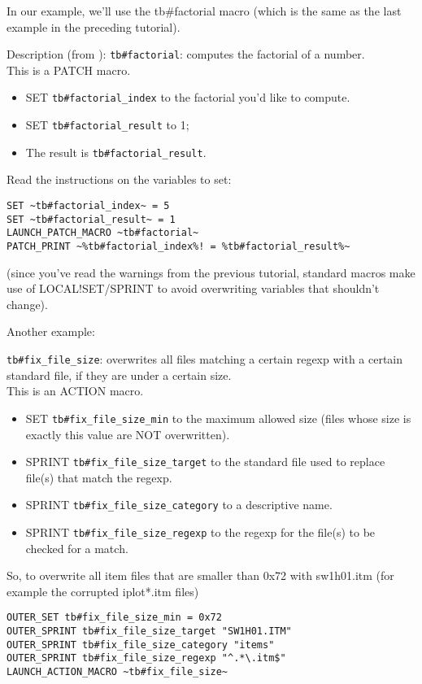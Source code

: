 \documentclass{article}
\def\ttref#1{\ahrefloc{#1}{\tt #1}}
\begin{document}
In our example, we'll use the tb\#factorial macro (which is the same as the
last example in the preceding tutorial).

Description (from \ttref{Macros Listing}):
\verb+tb#factorial+: computes the factorial of a number. \\
This is a PATCH macro.
\begin{itemize}
\item SET \verb+tb#factorial_index+ to the factorial you'd like to compute.
\item SET \verb+tb#factorial_result+ to 1;
\item The result is \verb+tb#factorial_result+.
\end{itemize}

Read the instructions on the variables to set:
\begin{verbatim}
SET ~tb#factorial_index~ = 5
SET ~tb#factorial_result~ = 1
LAUNCH_PATCH_MACRO ~tb#factorial~
PATCH_PRINT ~%tb#factorial_index%! = %tb#factorial_result%~
\end{verbatim}
(since you've read the warnings from the previous tutorial, standard macros
make use of LOCAL!SET/SPRINT to avoid overwriting variables that shouldn't
change).

Another example:

\verb+tb#fix_file_size+: overwrites all files matching a certain regexp with a
certain standard file, if they are under a certain size. \\
This is an ACTION macro.
\begin{itemize}
\item SET \verb+tb#fix_file_size_min+ to the maximum allowed size
(files whose size is exactly this value are NOT overwritten).
\item SPRINT \verb+tb#fix_file_size_target+ to the standard file used to replace file(s) that match the regexp.
\item SPRINT \verb+tb#fix_file_size_category+ to a descriptive name.
\item SPRINT \verb+tb#fix_file_size_regexp+ to the regexp for the file(s) to be checked for a match.
\end{itemize}
So, to overwrite all item files that are smaller than 0x72 with sw1h01.itm
(for example the corrupted iplot*.itm files)
\begin{verbatim}
OUTER_SET tb#fix_file_size_min = 0x72
OUTER_SPRINT tb#fix_file_size_target "SW1H01.ITM"
OUTER_SPRINT tb#fix_file_size_category "items"
OUTER_SPRINT tb#fix_file_size_regexp "^.*\.itm$"
LAUNCH_ACTION_MACRO ~tb#fix_file_size~
\end{verbatim}
\end{document}
